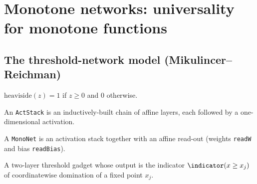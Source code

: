 \chapter{Monotone networks: universality for monotone functions}

\section{The threshold-network model (Mikulincer--Reichman)}

\begin{definition}\label{def:heaviside}
  \leanok
  $\mathrm{heaviside}(z)=1$ if $z\ge 0$ and $0$ otherwise.
\end{definition}

\begin{definition}\label{def:actstack}
  \leanok
  An \texttt{ActStack} is an inductively-built chain of affine layers, each followed by a
  one-dimensional activation.
\end{definition}

\begin{definition}\label{def:mononet}
  \leanok
  A \texttt{MonoNet} is an activation stack together with an affine read-out (weights
  \texttt{readW} and bias \texttt{readBias}).
\end{definition}

\begin{definition}\label{def:domination}
  \leanok
  A two-layer threshold gadget whose output is the indicator $\indicator(x\ge x_j)$ of
  coordinatewise domination of a fixed point $x_j$.
\end{definition}

